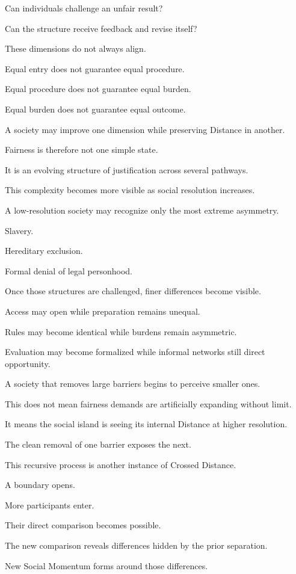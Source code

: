 Can individuals challenge an unfair result?

Can the structure receive feedback and revise itself?

These dimensions do not always align.

Equal entry does not guarantee equal procedure.

Equal procedure does not guarantee equal burden.

Equal burden does not guarantee equal outcome.

A society may improve one dimension while preserving Distance in another.

Fairness is therefore not one simple state.

It is an evolving structure of justification across several pathways.

This complexity becomes more visible as social resolution increases.

A low-resolution society may recognize only the most extreme asymmetry.

Slavery.

Hereditary exclusion.

Formal denial of legal personhood.

Once those structures are challenged, finer differences become visible.

Access may open while preparation remains unequal.

Rules may become identical while burdens remain asymmetric.

Evaluation may become formalized while informal networks still direct opportunity.

A society that removes large barriers begins to perceive smaller ones.

This does not mean fairness demands are artificially expanding without limit.

It means the social island is seeing its internal Distance at higher resolution.

The clean removal of one barrier exposes the next.

This recursive process is another instance of Crossed Distance.

A boundary opens.

More participants enter.

Their direct comparison becomes possible.

The new comparison reveals differences hidden by the prior separation.

New Social Momentum forms around those differences.

